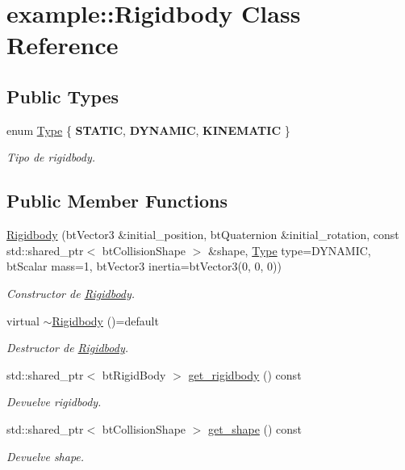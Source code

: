 \hypertarget{classexample_1_1_rigidbody}{}\section{example\+::Rigidbody Class Reference}
\label{classexample_1_1_rigidbody}
\subsection*{Public Types}
\begin{DoxyCompactItemize}
\item 
enum \mbox{\hyperlink{classexample_1_1_rigidbody_a527ee68e1748a5a6014b7fcbe9f86e3d}{Type}} \{ {\bfseries S\+T\+A\+T\+IC}, 
{\bfseries D\+Y\+N\+A\+M\+IC}, 
{\bfseries K\+I\+N\+E\+M\+A\+T\+IC}
 \}
\begin{DoxyCompactList}\small\item\em Tipo de rigidbody. \end{DoxyCompactList}\end{DoxyCompactItemize}
\subsection*{Public Member Functions}
\begin{DoxyCompactItemize}
\item 
\mbox{\hyperlink{classexample_1_1_rigidbody_adbc37f0858cb94f23f0a6167ffbf34f5}{Rigidbody}} (bt\+Vector3 \&initial\+\_\+position, bt\+Quaternion \&initial\+\_\+rotation, const std\+::shared\+\_\+ptr$<$ bt\+Collision\+Shape $>$ \&shape, \mbox{\hyperlink{classexample_1_1_rigidbody_a527ee68e1748a5a6014b7fcbe9f86e3d}{Type}} type=D\+Y\+N\+A\+M\+IC, bt\+Scalar mass=1, bt\+Vector3 inertia=bt\+Vector3(0, 0, 0))
\begin{DoxyCompactList}\small\item\em Constructor de \mbox{\hyperlink{classexample_1_1_rigidbody}{Rigidbody}}. \end{DoxyCompactList}\item 
virtual \mbox{\hyperlink{classexample_1_1_rigidbody_a54ec639fdf123f889c35c1b14b2d1a49}{$\sim$\+Rigidbody}} ()=default
\begin{DoxyCompactList}\small\item\em Destructor de \mbox{\hyperlink{classexample_1_1_rigidbody}{Rigidbody}}. \end{DoxyCompactList}\item 
std\+::shared\+\_\+ptr$<$ bt\+Rigid\+Body $>$ \mbox{\hyperlink{classexample_1_1_rigidbody_a57f66712ecdfce778482ae59ec179177}{get\+\_\+rigidbody}} () const
\begin{DoxyCompactList}\small\item\em Devuelve rigidbody. \end{DoxyCompactList}\item 
std\+::shared\+\_\+ptr$<$ bt\+Collision\+Shape $>$ \mbox{\hyperlink{classexample_1_1_rigidbody_ad5b6d14eddbb8d0f0d2b99cff44178b9}{get\+\_\+shape}} () const
\begin{DoxyCompactList}\small\item\em Devuelve shape. \end{DoxyCompactList}\end{DoxyCompactItemize}


